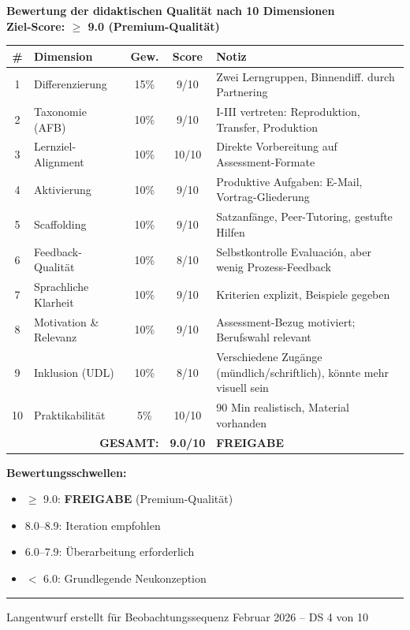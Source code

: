 \documentclass[11pt, a4paper]{article}
\begin{document}
\begin{scorebox}
\textbf{Bewertung der didaktischen Qualität nach 10 Dimensionen}\\
\textbf{Ziel-Score: $\geq$ 9.0 (Premium-Qualität)}

\vspace{1em}
\begin{tabular}{|c|l|c|c|p{4.5cm}|}
    \hline
    \textbf{\#} & \textbf{Dimension} & \textbf{Gew.} & \textbf{Score} & \textbf{Notiz} \\
    \hline
    1 & Differenzierung & 15\% & 9/10 & Zwei Lerngruppen, Binnendiff. durch Partnering \\
    \hline
    2 & Taxonomie (AFB) & 10\% & 9/10 & I-III vertreten: Reproduktion, Transfer, Produktion \\
    \hline
    3 & Lernziel-Alignment & 10\% & 10/10 & Direkte Vorbereitung auf Assessment-Formate \\
    \hline
    4 & Aktivierung & 10\% & 9/10 & Produktive Aufgaben: E-Mail, Vortrag-Gliederung \\
    \hline
    5 & Scaffolding & 10\% & 9/10 & Satzanfänge, Peer-Tutoring, gestufte Hilfen \\
    \hline
    6 & Feedback-Qualität & 10\% & 8/10 & Selbstkontrolle Evaluación, aber wenig Prozess-Feedback \\
    \hline
    7 & Sprachliche Klarheit & 10\% & 9/10 & Kriterien explizit, Beispiele gegeben \\
    \hline
    8 & Motivation \& Relevanz & 10\% & 9/10 & Assessment-Bezug motiviert; Berufswahl relevant \\
    \hline
    9 & Inklusion (UDL) & 10\% & 8/10 & Verschiedene Zugänge (mündlich/schriftlich), könnte mehr visuell sein \\
    \hline
    10 & Praktikabilität & 5\% & 10/10 & 90 Min realistisch, Material vorhanden \\
    \hline
    \multicolumn{3}{|r|}{\textbf{GESAMT:}} & \textbf{9.0/10} & \textcolor{success}{\textbf{FREIGABE}} \\
    \hline
\end{tabular}

\vspace{1em}
\textbf{Bewertungsschwellen:}
\begin{itemize}
    \item[\checkmark] \textcolor{success}{$\geq$ 9.0: \textbf{FREIGABE} (Premium-Qualität)}
    \item[$\Box$] \textcolor{warningorange}{8.0--8.9: Iteration empfohlen}
    \item[$\Box$] 6.0--7.9: Überarbeitung erforderlich
    \item[$\Box$] $<$ 6.0: Grundlegende Neukonzeption
\end{itemize}
\end{scorebox}

\vfill

\hrule
\vspace{0.3cm}
\begin{center}
    {\small\color{grau} Langentwurf erstellt für Beobachtungssequenz Februar 2026 -- DS 4 von 10}
\end{center}
\end{document}
